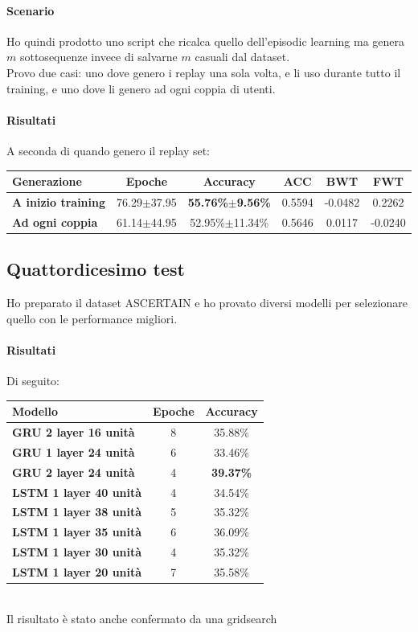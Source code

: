 \documentclass[11pt, a4paper, twoside, openright]{book}
\begin{document}
\paragraph{Scenario} Ho quindi prodotto uno script che ricalca quello dell'episodic learning ma genera $m$ sottosequenze invece di salvarne $m$ casuali dal dataset.\\
Provo due casi: uno dove genero i replay una sola volta, e li uso durante tutto il training, e uno dove li genero ad ogni coppia di utenti.
\paragraph{Risultati} A seconda di quando genero il replay set:\\
\begin{tabular}{l|c|c|c|c|c}
    \textbf{Generazione} & \textbf{Epoche} & \textbf{Accuracy} & \textbf{ACC} & \textbf{BWT} & \textbf{FWT} \\
    \hline 
    \textbf{A inizio training} & 76.29$\pm$37.95 & \textbf{55.76\%$\pm$9.56\%} & 0.5594 & -0.0482 & 0.2262 \\
    \textbf{Ad ogni coppia} & 61.14$\pm$44.95 & 52.95\%$\pm$11.34\% & 0.5646 & 0.0117 & -0.0240\\
\end{tabular}
\subsection{Quattordicesimo test}
Ho preparato il dataset ASCERTAIN e ho provato diversi modelli per selezionare quello con le performance migliori.
\paragraph{Risultati} Di seguito:\\
\begin{tabular}{l|c|c}
    \textbf{Modello} & \textbf{Epoche} & \textbf{Accuracy} \\
    \hline 
    \textbf{GRU 2 layer 16 unità} & 8 & 35.88\% \\
    \textbf{GRU 1 layer 24 unità} & 6 & 33.46\% \\
    \textbf{GRU 2 layer 24 unità} & 4 & \textbf{39.37\%} \\
    \textbf{LSTM 1 layer 40 unità} & 4 & 34.54\% \\
    \textbf{LSTM 1 layer 38 unità} & 5 & 35.32\% \\
    \textbf{LSTM 1 layer 35 unità} & 6 & 36.09\% \\
    \textbf{LSTM 1 layer 30 unità} & 4 & 35.32\% \\
    \textbf{LSTM 1 layer 20 unità} & 7 & 35.58\% \\
\end{tabular}\\
Il risultato è stato anche confermato da una gridsearch
\pagebreak
\end{document}
